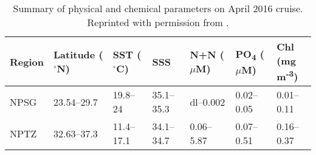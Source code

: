 \begin{table}[ht]
\centering
\begin{tabular}{lllllll}
  \hline
Region & \makecell{Latitude \\ ($^\circ$N)} & \makecell{SST \\ ($^\circ$C)} & SSS & \makecell{N+N \\ ($\mu$M)} & \makecell{PO\textsubscript{4} \\ ($\mu$M)} & \makecell{Chl \\ (mg m\textsuperscript{-3})} \\ 
  \hline
NPSG & 23.54--29.7 & 19.8--24 & 35.1--35.3 & dl--0.002 & 0.02--0.05 & 0.01--0.11 \\ 
  NPTZ & 32.63--37.3 & 11.4--17.1 & 34.1--34.7 & 0.06--5.87 & 0.07--0.51 & 0.16--0.37 \\ 
   \hline
\end{tabular}
\caption{\label{ZoneDescriptions} Summary of physical and chemical parameters on April 2016 cruise.  Reprinted with permission from \cite{Gradoville2020}.} 
\end{table}
